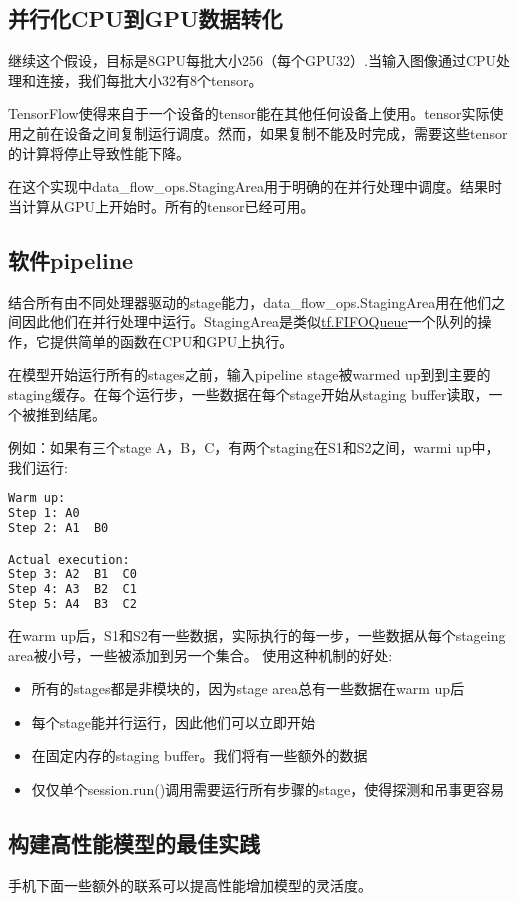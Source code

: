 \subsection{并行化CPU到GPU数据转化}
继续这个假设，目标是8GPU每批大小256（每个GPU32）.当输入图像通过CPU处理和连接，我们每批大小32有8个tensor。

TensorFlow使得来自于一个设备的tensor能在其他任何设备上使用。tensor实际使用之前在设备之间复制运行调度。然而，如果复制不能及时完成，需要这些tensor的计算将停止导致性能下降。

在这个实现中data\_flow\_ops.StagingArea用于明确的在并行处理中调度。结果时当计算从GPU上开始时。所有的tensor已经可用。

\subsection{软件pipeline}
结合所有由不同处理器驱动的stage能力，data\_flow\_ops.StagingArea用在他们之间因此他们在并行处理中运行。StagingArea是类似\href{https://www.tensorflow.org/api_docs/python/tf/FIFOQueue}{tf.FIFOQueue}一个队列的操作，它提供简单的函数在CPU和GPU上执行。

在模型开始运行所有的stages之前，输入pipeline stage被warmed up到到主要的staging缓存。在每个运行步，一些数据在每个stage开始从staging buffer读取，一个被推到结尾。

例如：如果有三个stage A，B，C，有两个staging在S1和S2之间，warmi up中，我们运行:
\begin{lstlisting}[language=Bash]
Warm up:
Step 1: A0
Step 2: A1  B0

Actual execution:
Step 3: A2  B1  C0
Step 4: A3  B2  C1
Step 5: A4  B3  C2
\end{lstlisting}
在warm up后，S1和S2有一些数据，实际执行的每一步，一些数据从每个stageing area被小号，一些被添加到另一个集合。
使用这种机制的好处:
\begin{itemize}
	\item 所有的stages都是非模块的，因为stage area总有一些数据在warm up后
	\item 每个stage能并行运行，因此他们可以立即开始
	\item 在固定内存的staging buffer。我们将有一些额外的数据
	\item 仅仅单个session.run()调用需要运行所有步骤的stage，使得探测和吊事更容易
\end{itemize}
\subsection{构建高性能模型的最佳实践}
手机下面一些额外的联系可以提高性能增加模型的灵活度。
